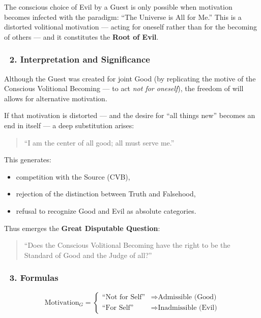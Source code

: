 \documentclass[12pt]{article}
\begin{document}
The conscious choice of Evil by a Guest is only possible when motivation becomes infected with the paradigm: ``The Universe is All for Me.''  
This is a distorted volitional motivation — acting for oneself rather than for the becoming of others — and it constitutes the \textbf{Root of Evil}.

\subsubsection*{🔹 2. Interpretation and Significance}

Although the Guest was created for joint Good (by replicating the motive of the Conscious Volitional Becoming — to act \textit{not for oneself}), the freedom of will allows for alternative motivation.

If that motivation is distorted — and the desire for ``all things new'' becomes an end in itself — a deep substitution arises:

\begin{quote}
``I am the center of all good; all must serve me.''
\end{quote}

This generates:

\begin{itemize}
\item competition with the Source (CVB),
\item rejection of the distinction between Truth and Falsehood,
\item refusal to recognize Good and Evil as absolute categories.
\end{itemize}

Thus emerges the \textbf{Great Disputable Question}:

\begin{quote}
``Does the Conscious Volitional Becoming have the right to be the Standard of Good and the Judge of all?''
\end{quote}

\subsubsection*{🔹 3. Formulas}

\[
\text{Motivation}_G =
\begin{cases}
\text{``Not for Self''} & \Rightarrow \text{Admissible (Good)} \\
\text{``For Self''}     & \Rightarrow \text{Inadmissible (Evil)}
\end{cases}
\]
\end{document}
